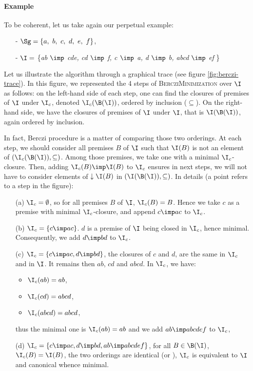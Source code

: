 \paragraph{Example} To be coherent, let us take again our perpetual example:
\begin{itemize}
	\item[-] $\Sg = \{a, \ b, \ c, \ d, \ e, \ f \}$,
	\item[-] $\I =$ \{\textit{ab $\imp$ cde, cd $\imp$ f, c $\imp$ a, d $\imp$ b, abcd $\imp$ ef} \} 
\end{itemize}
Let us illustrate the algorithm through a graphical trace (see figure 
\ref{fig:berczi-trace}). In this figure, we represented the 4 steps of 
\textsc{BercziMinimization} over $\I$ as follows: on the left-hand side of each 
step, one can find the closures of premises of $\I$ under $\I_c$, denoted 
$\I_c(\B(\I))$, ordered by inclusion ($\subseteq$). On the right-hand side, we 
have the closures of premises of $\I$ under $\I$, that is $\I(\B(\I))$, again 
ordered by inclusion.

\vspace{1.2em}

In fact, Berczi procedure is a matter of comparing those two orderings. At each
step, we should consider all premises $B$ of $\I$ such that $\I(B)$ is not an
element of $(\I_c(\B(\I)), \subseteq)$. Among those premises, we take one with
a minimal $\I_c$-closure. Then, adding $\I_c(B) \imp \I(B)$ to $\I_c$ ensures
in next steps, we will not have to consider elements of $\downarrow \I(B)$ in
$(\I(\B(\I)), \subseteq)$. In details (a point refers to a step in the figure):
\begin{itemize}
	\item[(a)] $\I_c = \emptyset$, so for all premises $B$ of $\I$, $\I_c(B) = 
	B$.	Hence we take $c$ as a premise with minimal $\I_c$-closure, and append 
	$c \imp ac$ to $\I_c$.
	\item[(b)] $\I_c = \{ c \imp ac \}$. $d$ is a premise of $\I$ being closed 
	in $\I_c$, hence minimal. Consequently, we add $d \imp bd$ to $\I_c$.
	\item[(c)] $\I_c = \{ c \imp ac, d \imp bd \}$, the closures of $c$ and 
	$d$, are the same in $\I_c$ and in $\I$. It remains then $ab$, $cd$ and 
	$abcd$. In $\I_c$, we have:
	\begin{itemize}
		\item $\I_c(ab) = ab$,
		\item $\I_c(cd) = abcd$,
		\item $\I_c(abcd) = abcd$,
	\end{itemize}
	thus the minimal one is $\I_c(ab) = ab$ and we add $ab \imp abcdef$ to 
	$\I_c$,
	\item[(d)] $\I_c = \{ c \imp ac, d \imp bd, ab \imp abcdef 
	\}$, for all $B \in \B(\I)$, $\I_c(B) = \I(B)$, the two orderings
	are identical (or ), $\I_c$ is equivalent to $\I$ and
	canonical whence minimal.
\end{itemize}


